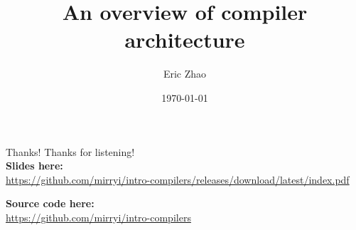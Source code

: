 \documentclass[xcolor={dvipsnames},xtable]{beamer}
\title{An overview of compiler architecture}
\subtitle{}
\date{\today}
\author{Eric Zhao}
\begin{document}

\newcommand{\sectiontitle}{}
\newcommand{\currenttitle}{}

\maketitle

\newcommand{\subdir}{sections}
\newcommand{\codedir}{listings}




\begin{frame}{Thanks!}
  Thanks for listening! \\[2em]

  \textbf{Slides here:} \\
  {\scriptsize \url{https://github.com/mirryi/intro-compilers/releases/download/latest/index.pdf}}
  
  \textbf{Source code here:} \\
  {\scriptsize \url{https://github.com/mirryi/intro-compilers}}
    
\end{frame}
\end{document}
